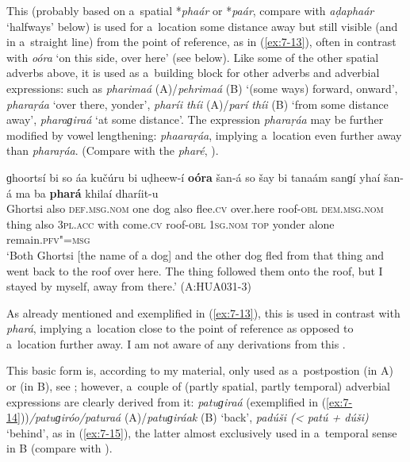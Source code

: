  This   (probably based on a~spatial
 *\textit{phaár} or *\textit{paár}, compare with \textit{aḍaphaár} `halfways' below) is used
for a~location some distance away but still visible (and in a~straight line) from the point of
reference, as in (\ref{ex:7-13}), often in contrast with \textit{oóra} `on this side, over here'
(see below). Like some of the other spatial adverbs above, it is used as a~building block for other
adverbs and adverbial expressions: such as \textit{pharimaá} (A)/\textit{pehrimaá} (B)
`(some ways) forward, onward', \textit{pharaṛáa} `over there, yonder', \textit{pharíi
  thíi} (A)/\textit{parí thíi} (B) `from some distance away', \textit{pharaɡiraá}
`at some distance'. The  expression \textit{pharaṛáa} may be further modified by vowel
lengthening: \textit{phaaraṛáa}, implying a~location even further away than
\textit{pharaṛáa}. (Compare with the  \textit{pharé}, ).

\begin{exe}
\ex
\label{ex:7-13}
\gll ɡhoortsí bi so áa kučúru bi uḍheew-í \textbf{oóra} šan-á so šay bi tanaám sanɡí yhaí šan-á ma ba \textbf{phará} khilaí dharíit-u \\
Ghortsi also \textsc{def.msg.nom} one dog also flee.\textsc{cv} over.here roof-\textsc{obl} \textsc{dem.msg.nom} thing also \textsc{3pl.acc} with come.\textsc{cv} roof-\textsc{obl} \textsc{1sg.nom} \textsc{top} yonder alone remain.\textsc{pfv"=msg}\\
\glt `Both Ghortsi [the name of a dog] and the other dog fled from that thing and went back to the roof over here. The thing followed them onto the roof, but I stayed by myself, away from there.' (A:HUA031-3)
\end{exe}

 As already mentioned and exemplified in (\ref{ex:7-13}), this   is used in contrast with \textit{phará}, implying a~location close to the point of reference as opposed to a~location further away. I am not aware of any derivations from this . 

 This basic form is, according to my material, only used as a~postpostion (in A) or  (in B), see ; however, a~couple of (partly spatial, partly temporal) adverbial expressions are clearly derived from it: \textit{patuɡiraá} (exemplified in (\ref{ex:7-14}))\textit{/patuɡiróo/paturaá} (A)/\textit{patuɡiráak} (B) `back', \textit{padúši ({\textless} patú + dúši)} `behind', as in (\ref{ex:7-15}), the latter almost exclusively used in a~temporal sense in B (compare with ).

